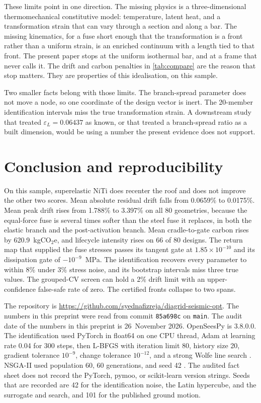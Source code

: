 \documentclass[10pt,a4paper]{article}
\begin{document}
These limits point in one direction. The missing physics is a three-dimensional thermomechanical constitutive model: temperature, latent heat, and a transformation strain that can vary through a section and along a bar. The missing kinematics, for a fuse short enough that the transformation is a front rather than a uniform strain, is an enriched continuum with a length tied to that front. The present paper stops at the uniform isothermal bar, and at a frame that never calls it. The drift and carbon penalties in \cref{tab:compare} are the reason that stop matters. They are properties of this idealisation, on this sample.

Two smaller facts belong with those limits. The branch-spread parameter does not move a node, so one coordinate of the design vector is inert. The 20-member identification intervals miss the true transformation strain. A downstream study that treated $\varepsilon_L=0.06437$ as known, or that treated a branch-spread ratio as a built dimension, would be using a number the present evidence does not support.

\section{Conclusion and reproducibility}
\label{sec:close}

On this sample, superelastic NiTi does recenter the roof and does not improve the other two scores. Mean absolute residual drift falls from 0.0659\% to 0.0175\%. Mean peak drift rises from 1.788\% to 3.397\% on all 80 geometries, because the equal-force fuse is several times softer than the steel fuse it replaces, in both the elastic branch and the post-activation branch. Mean cradle-to-gate carbon rises by 620.9~kgCO$_2$e, and lifecycle intensity rises on 66 of 80 designs. The return map that supplied the fuse stresses passes its tangent gate at $1.85\times 10^{-10}$ and its dissipation gate of $-10^{-9}$~MPa. The identification recovers every parameter to within 8\% under 3\% stress noise, and its bootstrap intervals miss three true values. The grouped-CV screen can hold a 2\% drift limit with an upper-confidence false-safe rate of zero. The certified fronts collapse to two spans.

The repository is \url{https://github.com/syednafizreja/diagrid-seismic-opt}. The numbers in this preprint were read from commit \texttt{85a698c} on \texttt{main}. The audit date of the numbers in this preprint is 26~November 2026. OpenSeesPy is 3.8.0.0. The identification used PyTorch in float64 on one CPU thread, Adam at learning rate 0.04 for 300 steps, then L-BFGS with iteration limit 80, history size 20, gradient tolerance $10^{-9}$, change tolerance $10^{-12}$, and a strong Wolfe line search \cite{paszke2019}. NSGA-II used population 60, 60 generations, and seed 42 \cite{deb2002}. The audited fact sheet does not record the PyTorch, pymoo, or scikit-learn version strings. Seeds that are recorded are 42 for the identification noise, the Latin hypercube, and the surrogate and search, and 101 for the published ground motion.
\end{document}
